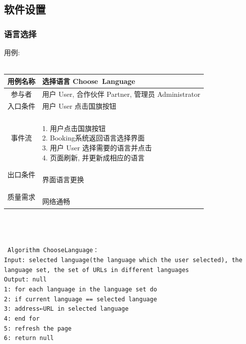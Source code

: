 \documentclass[11pt]{article}
\begin{document}
	\subsection{软件设置}
		\subsubsection{语言选择}
			用例: \\ \\
			\begin{tabular}{c|l}
			\hline
			用例名称 & 选择语言 Choose\ Language \\ \hline
			参与者 & 用户 User, 合作伙伴 Partner, 管理员 Administrator  \\ \hline
			入口条件 & 用户 User 点击国旗按钮 \\ \hline
			事件流 & 	\parbox{33em}{\ \\
						1. 用户点击国旗按钮 \\
						2. Booking系统返回语言选择界面 \\
						3. 用户 User 选择需要的语言并点击  \\
						4.  页面刷新, 并更新成相应的语言 \\
						} \\ \hline
			出口条件 & \parbox{33em}{\ \\
						界面语言更换 \\
						} \\ \hline
			质量需求 & \parbox{33em}{\ \\
						网络通畅 \\
						} \\ \hline
			\end{tabular} \\ \\ \\
			\texttt{
			Algorithm ChooseLanguage：\\
			Input: selected language(the language which the user selected), the language set, the set of URLs in different languages \\
			Output: null \\
			1: for each language in the language set do \\
			2:	if current language == selected language \\
			3:		address←URL in selected language \\
			4: end for \\
			5: refresh the page \\
			6: return null \\
			} \\
\end{document}
